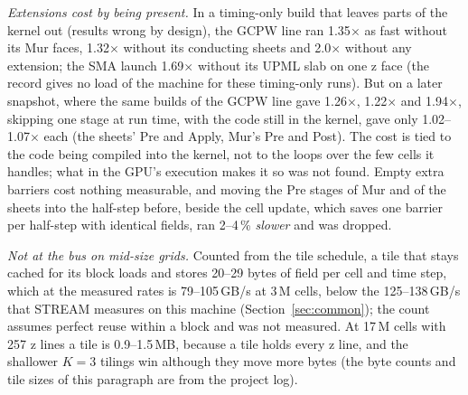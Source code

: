 \emph{Extensions cost by being present.} In a timing-only build that leaves parts of the kernel out (results wrong by
design), the GCPW line ran 1.35$\times$ as fast without its Mur faces, 1.32$\times$ without its conducting sheets and
2.0$\times$ without any extension; the SMA launch 1.69$\times$ without its UPML slab on one z face (the record gives no load of the machine for these
timing-only runs).
But on a later snapshot, where the same builds of the GCPW line gave 1.26$\times$, 1.22$\times$ and 1.94$\times$,
skipping one stage at run time, with the code still in the kernel, gave only 1.02--1.07$\times$ each (the sheets' Pre
and Apply, Mur's Pre and Post). The cost is tied to the code being compiled into the kernel, not
to the loops over the few cells it handles; what in the GPU's execution makes it so was not found. Empty extra barriers
cost nothing measurable, and moving the Pre stages of Mur and of the sheets into the half-step before, beside the cell
update, which saves one barrier per half-step with identical fields, ran 2--4\,\% \emph{slower} and was dropped.

\emph{Not at the bus on mid-size grids.} Counted from the tile schedule, a tile that stays cached for its block loads
and stores 20--29 bytes of field per cell and time step, which at the measured rates is 79--105\,GB/s at 3\,M cells,
below the 125--138\,GB/s that STREAM measures on this machine (Section~\ref{sec:common}); the count assumes perfect
reuse within a block and was not measured. At 17\,M cells with 257 z lines a tile is 0.9--1.5\,MB, because a tile
holds every z line, and the shallower $K=3$ tilings win although they move more bytes (the byte counts and tile sizes
of this paragraph are from the project log).

